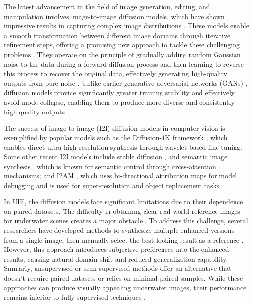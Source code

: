 \documentclass[3p,12pt,authoryear]{elsarticle}
\begin{document}
The latest advancement in the field of image generation, editing, and manipulation involves image-to-image diffusion models, which have shown impressive results in capturing complex image distributions \cite{shi2024cpdmcontentpreservingdiffusionmodel, w16131813, 10812849}. These models enable a smooth transformation between different image domains through iterative refinement steps, offering a promising new approach to tackle these challenging problems \cite{10.1007/s00138-024-01647-8, Croitoru_2023}. They operate on the principle of gradually adding random Gaussian noise to the data during a forward diffusion process and then learning to reverse this process to recover the original data, effectively generating high-quality outputs from pure noise \cite{10.1145/3626235}. Unlike earlier generative adversarial networks (GANs) \cite{IGLESIAS2023100553}, diffusion models provide significantly greater training stability and effectively avoid mode collapse, enabling them to produce more diverse and consistently high-quality outputs \cite{10.1145/3626235}.

The success of image-to-image (I2I) diffusion models in computer vision is exemplified by popular models such as the Diffusion-4K framework \cite{zhang2025diffusion4kultrahighresolutionimagesynthesis}, which enables direct ultra-high-resolution synthesis through wavelet-based fine-tuning. Some other recent I2I models include stable diffusion \cite{zhang2025diffusion4kultrahighresolutionimagesynthesis}, and semantic image synthesis \cite{liu2024iidmimagetoimagediffusionmodel}, which is known for semantic control through cross-attention mechanisms; and I2AM \cite{park2025i2aminterpretingimagetoimagelatent}, which uses bi-directional attribution maps for model debugging and is used for super-resolution and object replacement tasks.

In UIE, the diffusion models face significant limitations due to their dependence on paired datasets. The difficulty in obtaining clear real-world reference images for underwater scenes creates a major obstacle \cite{10220126, bb14, 10196309, tang2023underwaterimageenhancementtransformerbased}. To address this challenge, several researchers have developed methods to synthesize multiple enhanced versions from a single image, then manually select the best-looking result as a reference \cite{8917818, 9930878}. However, this approach introduces subjective preferences into the enhanced results, causing natural domain shift and reduced generalization capability. Similarly, unsupervised or semi-supervised methods offer an alternative that doesn't require paired datasets or relies on minimal paired samples. While these approaches can produce visually appealing underwater images, their performance remains inferior to fully supervised techniques \cite{7995024, a9}.
\end{document}
